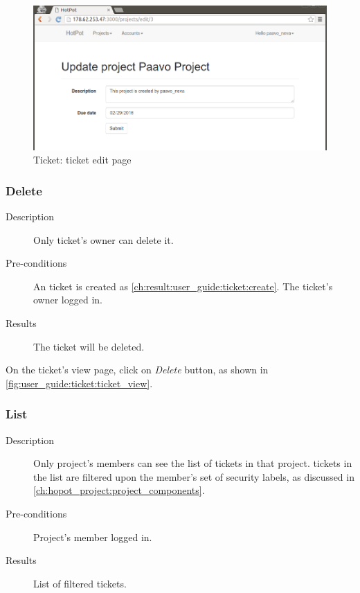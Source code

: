 \begin{figure}[bth]
\myfloatalign
\includegraphics[width=1.0\linewidth]{gfx/chapter_5/ticket/ticket_edit}
\caption[Ticket: ticket view page]{Ticket: ticket edit page}
\label{fig:user_guide:ticket:ticket_edit}
\end{figure}

\subsubsection{Delete}
\label{ch:result:user_guide:ticket:delete}

\begin{description}
\item[Description] Only ticket's owner can delete it.
\item[Pre-conditions] An ticket is created as \autoref{ch:result:user_guide:ticket:create}.
The ticket's owner logged in.
\item[Results] The ticket will be deleted.
\end{description}

On the ticket's view page, click on \emph{Delete} button, as shown in \autoref{fig:user_guide:ticket:ticket_view}.

\subsubsection{List}
\label{ch:result:user_guide:ticket:list}

\begin{description}
\item[Description] Only project's members can see the list of tickets in that project.
tickets in the list are filtered upon the member's set of security labels, as discussed in \autoref{ch:hopot_project:project_components}.
\item[Pre-conditions] Project's member logged in.
\item[Results] List of filtered tickets.
\end{description}

